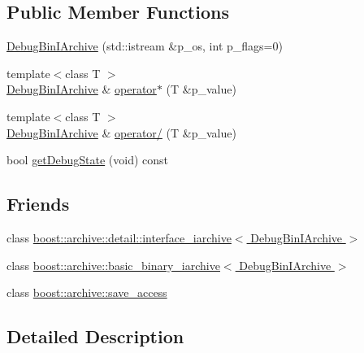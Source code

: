 \subsection*{Public Member Functions}
\begin{DoxyCompactItemize}
\item 
\hyperlink{classxtd_1_1serializer_1_1DebugBinIArchive_a4ea7040c4449afdc0a3559e2b7bc6625}{Debug\-Bin\-I\-Archive} (std\-::istream \&p\-\_\-os, int p\-\_\-flags=0)
\item 
{\footnotesize template$<$class T $>$ }\\\hyperlink{classxtd_1_1serializer_1_1DebugBinIArchive}{Debug\-Bin\-I\-Archive} \& \hyperlink{classxtd_1_1serializer_1_1DebugBinIArchive_a14ea4c855993c582b1bfd9a2c6528384}{operator$\ast$} (T \&p\-\_\-value)
\item 
{\footnotesize template$<$class T $>$ }\\\hyperlink{classxtd_1_1serializer_1_1DebugBinIArchive}{Debug\-Bin\-I\-Archive} \& \hyperlink{classxtd_1_1serializer_1_1DebugBinIArchive_a16c6f8a7cfaf497756c3edbfa16b9c0c}{operator/} (T \&p\-\_\-value)
\item 
bool \hyperlink{classxtd_1_1serializer_1_1DebugBinIArchive_a94745bb397fc67967d2ec07dc84d8c7e}{get\-Debug\-State} (void) const 
\end{DoxyCompactItemize}
\subsection*{Friends}
\begin{DoxyCompactItemize}
\item 
class \hyperlink{classxtd_1_1serializer_1_1DebugBinIArchive_aace6c76e9b138089c32705b6ec13b0e5}{boost\-::archive\-::detail\-::interface\-\_\-iarchive$<$ Debug\-Bin\-I\-Archive $>$}
\item 
class \hyperlink{classxtd_1_1serializer_1_1DebugBinIArchive_abc4efd1d58236e3dbfef39240b5457d4}{boost\-::archive\-::basic\-\_\-binary\-\_\-iarchive$<$ Debug\-Bin\-I\-Archive $>$}
\item 
class \hyperlink{classxtd_1_1serializer_1_1DebugBinIArchive_aaca003bb8a4fc59424e4025130da4edd}{boost\-::archive\-::save\-\_\-access}
\end{DoxyCompactItemize}


\subsection{Detailed Description}


